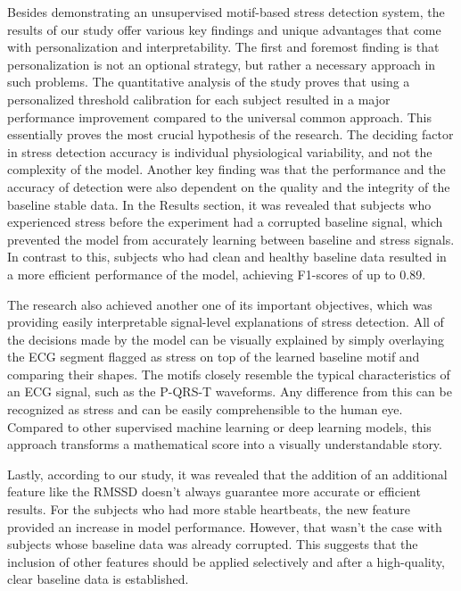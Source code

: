 \documentclass[conference,10pt]{IEEEtran}
\begin{document}
Besides demonstrating an unsupervised motif-based stress detection system, the results of our study offer various key findings and unique advantages that come with personalization and interpretability. 
The first and foremost finding is that personalization is not an optional strategy, but rather a necessary approach in such problems. The quantitative analysis of the study proves that using a personalized threshold calibration for each subject resulted in a major performance improvement compared to the universal common approach. This essentially proves the most crucial hypothesis of the research. The deciding factor in stress detection accuracy is individual physiological variability, and not the complexity of the model. 
Another key finding was that the performance and the accuracy of detection were also dependent on the quality and the integrity of the baseline stable data. In the Results section, it was revealed that subjects who experienced stress before the experiment had a corrupted baseline signal, which prevented the model from accurately learning between baseline and stress signals. In contrast to this, subjects who had clean and healthy baseline data resulted in a more efficient performance of the model, achieving F1-scores of up to 0.89. 

The research also achieved another one of its important objectives, which was providing easily interpretable signal-level explanations of stress detection. All of the decisions made by the model can be visually explained by simply overlaying the ECG segment flagged as stress on top of the learned baseline motif and comparing their shapes. The motifs closely resemble the typical characteristics of an ECG signal, such as the P-QRS-T waveforms. Any difference from this can be recognized as stress and can be easily comprehensible to the human eye. Compared to other supervised machine learning or deep learning models, this approach transforms a mathematical score into a visually understandable story. 

Lastly, according to our study, it was revealed that the addition of an additional feature like the RMSSD doesn’t always guarantee more accurate or efficient results. For the subjects who had more stable heartbeats, the new feature provided an increase in model performance. However, that wasn’t the case with subjects whose baseline data was already corrupted. This suggests that the inclusion of other features should be applied selectively and after a high-quality, clear baseline data is established.
\end{document}
